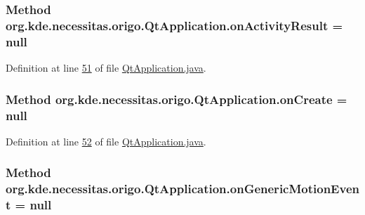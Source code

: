 \hypertarget{classorg_1_1kde_1_1necessitas_1_1origo_1_1_qt_application_add9ee10c3ded40d66ef7d8ce6d4d1aef}{
\subsubsection[{on\-Activity\-Result}]{\setlength{\rightskip}{0pt plus 5cm}Method org.\-kde.\-necessitas.\-origo.\-Qt\-Application.\-on\-Activity\-Result = null\hspace{0.3cm}{\ttfamily [static]}}}\label{d0/da0/classorg_1_1kde_1_1necessitas_1_1origo_1_1_qt_application_add9ee10c3ded40d66ef7d8ce6d4d1aef}


Definition at line \hyperlink{_qt_application_8java_source_l00051}{51} of file \hyperlink{_qt_application_8java_source}{Qt\-Application.\-java}.

\hypertarget{classorg_1_1kde_1_1necessitas_1_1origo_1_1_qt_application_af48a7b3b90f3b9977d4968e4d9dea8dc}{
\subsubsection[{on\-Create}]{\setlength{\rightskip}{0pt plus 5cm}Method org.\-kde.\-necessitas.\-origo.\-Qt\-Application.\-on\-Create = null\hspace{0.3cm}{\ttfamily [static]}}}\label{d0/da0/classorg_1_1kde_1_1necessitas_1_1origo_1_1_qt_application_af48a7b3b90f3b9977d4968e4d9dea8dc}


Definition at line \hyperlink{_qt_application_8java_source_l00052}{52} of file \hyperlink{_qt_application_8java_source}{Qt\-Application.\-java}.

\hypertarget{classorg_1_1kde_1_1necessitas_1_1origo_1_1_qt_application_a8b387a48af075841808ff0a6b6821f38}{
\subsubsection[{on\-Generic\-Motion\-Event}]{\setlength{\rightskip}{0pt plus 5cm}Method org.\-kde.\-necessitas.\-origo.\-Qt\-Application.\-on\-Generic\-Motion\-Event = null\hspace{0.3cm}{\ttfamily [static]}}}\label{d0/da0/classorg_1_1kde_1_1necessitas_1_1origo_1_1_qt_application_a8b387a48af075841808ff0a6b6821f38}


